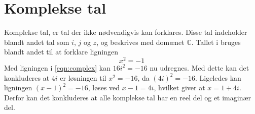 \section{Komplekse tal}
Komplekse tal, er tal der ikke nødvendigvis kan forklares. 
Disse tal indeholder blandt andet tal som $i$, $j$ og $z$, og beskrives med domænet $\mathbb{C}$.
Tallet i bruges blandt andet til at forklare ligningen
\begin{equation}
    \label{eqn:complex}
    x^2=-1
\end{equation}
Med ligningen i \cref{eqn:complex} kan $16i^2=-16$ nu udregnes. 
Med dette kan det konkluderes at $4i$ er løsningen til $x^2=-16$, da $(4i)^2=-16$.
Ligeledes kan ligningen $(x-1)^2=-16$, løses ved $x-1=4i$, hvilket giver at $x=1+4i$.
Derfor kan det konkluderes at alle komplekse tal har en reel del og et imaginær del.
